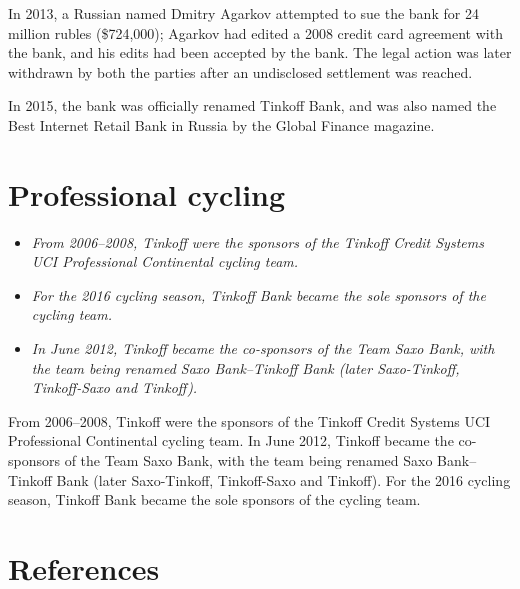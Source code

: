 In 2013, a Russian named Dmitry Agarkov attempted to sue the bank for 24
million rubles (\$724,000); Agarkov had edited a 2008 credit card
agreement with the bank, and his edits had been accepted by the bank.
The legal action was later withdrawn by both the parties after an
undisclosed settlement was reached.

In 2015, the bank was officially renamed Tinkoff Bank, and was also
named the Best Internet Retail Bank in Russia by the Global Finance
magazine.

\section{Professional cycling}\label{professional-cycling}

\begin{itemize}
\item
  \emph{From 2006--2008, Tinkoff were the sponsors of the Tinkoff Credit
  Systems UCI Professional Continental cycling team.}
\item
  \emph{For the 2016 cycling season, Tinkoff Bank became the sole
  sponsors of the cycling team.}
\item
  \emph{In June 2012, Tinkoff became the co-sponsors of the Team Saxo
  Bank, with the team being renamed Saxo Bank--Tinkoff Bank (later
  Saxo-Tinkoff, Tinkoff-Saxo and Tinkoff).}
\end{itemize}

From 2006--2008, Tinkoff were the sponsors of the Tinkoff Credit Systems
UCI Professional Continental cycling team. In June 2012, Tinkoff became
the co-sponsors of the Team Saxo Bank, with the team being renamed Saxo
Bank--Tinkoff Bank (later Saxo-Tinkoff, Tinkoff-Saxo and Tinkoff). For
the 2016 cycling season, Tinkoff Bank became the sole sponsors of the
cycling team.

\section{References}\label{references}
